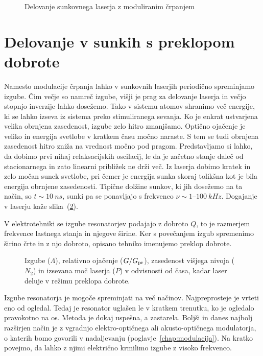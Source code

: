 \begin{figure}[h]
\centering
\def\svgwidth{90truemm} 

\caption{Delovanje sunkovnega laserja z moduliranim črpanjem}
\label{fig:pulseG}
\end{figure}

\section{Delovanje v sunkih s preklopom dobrote}
Namesto modulacije črpanja lahko v sunkovnih laserjih periodično spreminjamo 
izgube. Čim večje so namreč izgube, višji je prag za delovanje laserja in 
večjo stopnjo inverzije lahko dosežemo. Tako v sistemu atomov shranimo več 
energije, ki se lahko izseva iz sistema preko stimuliranega sevanja. 
Ko je enkrat ustvarjena velika obrnjena zasedenost, izgube zelo hitro zmanjšamo. 
Optično ojačenje je veliko in energija svetlobe v kratkem času močno naraste. 
S tem se tudi obrnjena zasedenost hitro zniža na vrednost močno pod pragom.
Predstavljamo si lahko, da dobimo prvi nihaj relaksacijskih oscilacij, le da
je začetno stanje daleč od stacionarnega in zato linearni približek ne drži več.
Iz laserja dobimo kratek in zelo močan sunek svetlobe, pri čemer je energija
sunka skoraj tolikšna kot je bila energija obrnjene zasedenosti. Tipične
dolžine sunkov, ki jih dosežemo na ta način, so $t \sim 10~\si{ns}$, sunki
pa se ponavljajo s frekvenco $\nu \sim 1$--$100~\si{kHz}$.
Dogajanje v laserju kaže slika~(\ref{fig:pulseQ}).

\begin{remark}
V elektrotehniki se izgube resonatorjev podajajo z dobroto $Q$, to je razmerjem
frekvence lastnega stanja in njegove širine. Ker s povečanjem izgub spremenimo 
širino črte in z njo dobroto, opisano tehniko imenujemo preklop dobrote. 
\end{remark}

\begin{figure}[h]
\centering
\def\svgwidth{90truemm} 

\caption{Izgube ($\Lambda$), relativno ojačenje ($G/G_{\rm pr}$), zasedenost višjega 
nivoja ($N_2$) in izsevana moč laserja ($P$) v odvisnosti od časa, kadar laser 
deluje v režimu preklopa dobrote.}
\label{fig:pulseQ}
\end{figure}

Izgube resonatorja je mogoče spreminjati na več načinov. Najpreprosteje
je vrteti eno od ogledal. Tedaj je resonator uglašen le v kratkem
trenutku, ko je ogledalo pravokotno na os. Metoda je dokaj uspešna, a
zastarela. Boljši in danes najbolj razširjen način je z vgradnjo
elektro-optičnega ali akusto-optičnega modulatorja, o katerih
bomo govorili v nadaljevanju (poglavje~\ref{chap:modulacija}). Na kratko povejmo, 
da lahko z njimi električno krmilimo izgube z visoko frekvenco.

